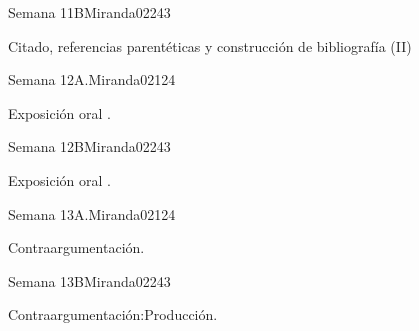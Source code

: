 \begin{syllabus}
\begin{unit}{Semana 11B}{Miranda02}{24}{3}
   \begin{topics}
      \item Citado, referencias parentéticas y construcción de bibliografía (II)
   \end{topics}

   \begin{learningoutcomes}
      \item 
      \item
      \item 
      \end{learningoutcomes}
\end{unit}

\begin{unit}{Semana 12A.}{Miranda02}{12}{4}
   \begin{topics}
      \item Exposición oral .
   \end{topics}
   \begin{learningoutcomes}
      \item 
   \end{learningoutcomes}
\end{unit}

\begin{unit}{Semana 12B}{Miranda02}{24}{3}
   \begin{topics}
      \item Exposición oral .
   \end{topics}

   \begin{learningoutcomes}
      \item 
      \item
      \item 
      \end{learningoutcomes}
\end{unit}

\begin{unit}{Semana 13A.}{Miranda02}{12}{4}
   \begin{topics}
      \item Contraargumentación.
   \end{topics}
   \begin{learningoutcomes}
      \item 
   \end{learningoutcomes}
\end{unit}

\begin{unit}{Semana 13B}{Miranda02}{24}{3}
   \begin{topics}
      \item Contraargumentación:Producción.
   \end{topics}


\end{unit}
\end{syllabus}
